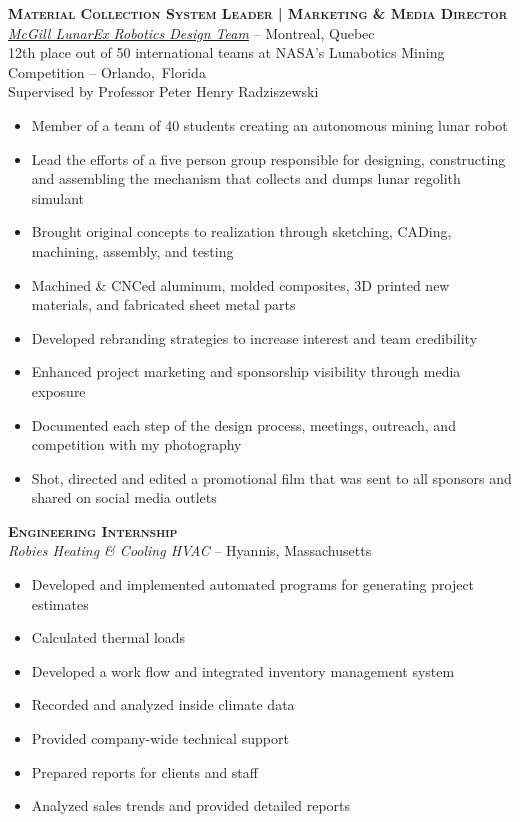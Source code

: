 \documentclass[12pt, letterpaper]{article}
\newcommand{\years}[1]{\marginnote{\footnotesize #1}} %
\begin{document}
	\begin{samepage}
		\years{8/2012 - 8/2013} \textbf{\scshape Material Collection System Leader | Marketing \& Media Director}\\
		\href{http://www.lunarex.mcgill.ca}{\textit{McGill LunarEx Robotics Design Team}} -- Montreal, Quebec\\
		{\small 12th place out of 50 international teams at NASA's Lunabotics Mining Competition -- Orlando,~Florida\\
		Supervised by Professor Peter Henry Radziszewski}
		\begin{itemize}
			\item Member of a team of 40 students creating an autonomous mining lunar robot 
			\item Lead the efforts of a five person group responsible for designing, constructing and assembling the mechanism that collects and dumps lunar regolith simulant
			\item Brought original concepts to realization through sketching, CADing, machining, assembly, and testing
			\item Machined \& CNCed aluminum, molded composites, 3D printed new materials, and fabricated sheet metal parts
			\item Developed rebranding strategies to increase interest and team credibility
			\item Enhanced project marketing and sponsorship visibility through media exposure
			\item Documented each step of the design process,  meetings, outreach, and competition with my photography
			\item Shot, directed and edited a promotional film that was sent to all sponsors and shared on social media outlets
		\end{itemize}
	\end {samepage}
	\vspace{.1in}


	\begin{samepage}
		\years{Summer 2012 \& Summer~2013} \textbf{\scshape Engineering Internship}\\
		\textit{Robies Heating \& Cooling HVAC} -- Hyannis, Massachusetts
		\begin{itemize}
			\item Developed and implemented automated programs for generating project estimates
			\item Calculated thermal loads
			\item Developed a work flow and integrated inventory management system
			\item Recorded and analyzed inside climate data
			\item Provided company-wide technical support
			\item Prepared reports for clients and staff
			\item Analyzed sales trends and provided detailed reports 
		\end{itemize}
	\end{samepage}
	\vspace{.1in}
\end{document}
